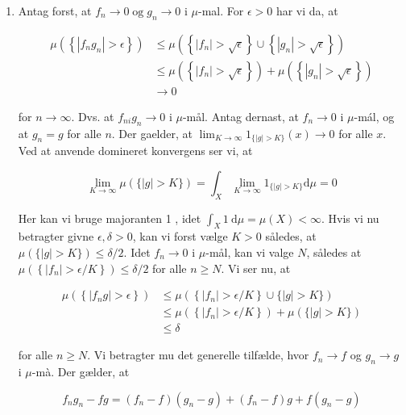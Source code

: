 \documentclass{Class}
\begin{document}
\begin{enumerate}
    \item Antag forst, at $f_n \rightarrow 0 \operatorname{og} g_n \rightarrow 0$ i $\mu$-mal. For $\epsilon>0$ har vi da, at

    $$
    \begin{aligned}
    \mu\left(\left\{\left|f_n g_n\right|>\epsilon\right\}\right) & \leq \mu\left(\left\{\left|f_n\right|>\sqrt{\epsilon}\right\} \cup\left\{\left|g_n\right|>\sqrt{\epsilon}\right\}\right) \\
    & \leq \mu\left(\left\{\left|f_n\right|>\sqrt{\epsilon}\right\}\right)+\mu\left(\left\{\left|g_n\right|>\sqrt{\epsilon}\right\}\right) \\
    & \rightarrow 0
    \end{aligned}
    $$
    
    for $n \rightarrow \infty$. Dvs. at $f_{n i} g_n \rightarrow 0$ i $\mu$-mål.
    Antag dernast, at $f_n \rightarrow 0$ i $\mu$-mál, og at $g_n=g$ for alle $n$. Der gaelder, at $\lim _{K \rightarrow \infty} 1_{\{|g|>K\}}(x) \rightarrow 0$ for alle $x$. Ved at anvende domineret konvergens ser vi, at
    
    $$
    \lim _{K \rightarrow \infty} \mu(\{|g|>K\})=\int_X \lim _{K \rightarrow \infty} 1_{\{|g|>K\}} \mathrm{d} \mu=0
    $$
    
    
    Her kan vi bruge majoranten 1 , idet $\int_X 1 \mathrm{~d} \mu=\mu(X)<\infty$. Hvis vi nu betragter givne $\epsilon, \delta>0$, kan vi forst vælge $K>0$ således, at $\mu(\{|g|>K\}) \leq \delta / 2$. Idet $f_n \rightarrow 0$ i $\mu$-mål, kan vi valge $N$, således at $\mu\left(\left\{\left|f_n\right|>\epsilon / K\right\}\right) \leq \delta / 2$ for alle $n \geq N$. Vi ser nu, at
    
    $$
    \begin{aligned}
    \mu\left(\left\{\left|f_n g\right|>\epsilon\right\}\right) & \leq \mu\left(\left\{\left|f_n\right|>\epsilon / K\right\} \cup\{|g|>K\}\right) \\
    & \leq \mu\left(\left\{\left|f_n\right|>\epsilon / K\right\}\right)+\mu(\{|g|>K\}) \\
    & \leq \delta
    \end{aligned}
    $$
    
    for alle $n \geq N$.
    Vi betragter mu det generelle tilfælde, hvor $f_n \rightarrow f$ og $g_n \rightarrow g$ i $\mu$-mà. Der gælder, at
    
    $$
    f_n g_n-f g=\left(f_n-f\right)\left(g_n-g\right)+\left(f_n-f\right) g+f\left(g_n-g\right)
    $$
    

\end{enumerate}
\end{document}
